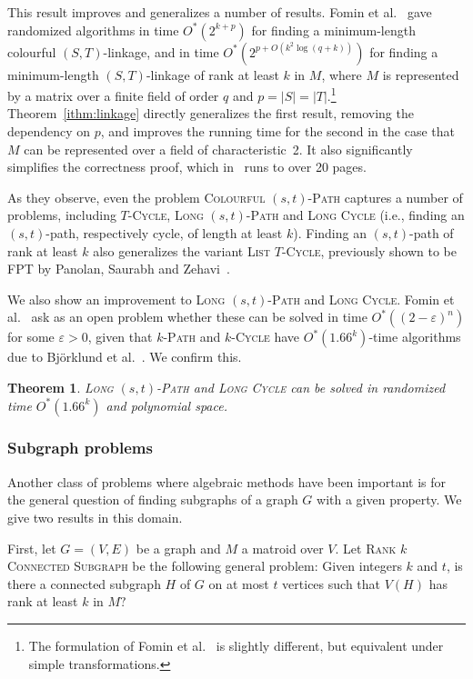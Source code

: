 \documentclass[10pt,a4paper]{article}
\newtheorem{theorem}{Theorem}[section]
\begin{document}
This result improves and generalizes a number of results.
Fomin et al.~\cite{FominGKSS24} gave randomized algorithms in time $O^*(2^{k+p})$
for finding a minimum-length colourful $(S,T)$-linkage,
and in time $O^*(2^{p+O(k^2 \log (q+k))})$
for finding a minimum-length $(S,T)$-linkage of rank at least $k$ in $M$,
where $M$ is represented by a matrix over a finite field of order $q$
and $p=|S|=|T|$.\footnote{The formulation of Fomin et al.~\cite{FominGKSS24}
  is slightly different, but equivalent under simple transformations.}
Theorem~\ref{ithm:linkage} directly generalizes the first result,
removing the dependency on $p$, and improves the running time for the second in the case
that $M$ can be represented over a field of characteristic~2.
It also significantly simplifies the correctness proof, which in~\cite{FominGKSS24}
runs to over 20 pages.

As they observe, even the problem \textsc{Colourful $(s,t)$-Path}
captures a number of problems, including \textsc{$T$-Cycle},
\textsc{Long $(s,t)$-Path} and \textsc{Long Cycle} (i.e.,
finding an $(s,t)$-path, respectively cycle, of length at least $k$).
Finding an $(s,t)$-path of rank at least $k$ also generalizes the
variant \textsc{List $T$-Cycle}, previously shown to be FPT by
Panolan, Saurabh and Zehavi~\cite{DBLP:journals/algorithmica/PanolanSZ19}.

We also show an improvement to \textsc{Long $(s,t)$-Path} and
\textsc{Long Cycle}. Fomin et al.~\cite{FominGKSS24} ask as an
open problem whether these can be solved in time $O^*((2-\varepsilon)^n)$
for some $\varepsilon > 0$, given that \textsc{$k$-Path} and \textsc{$k$-Cycle} 
have $O^*(1.66^k)$-time algorithms due to Björklund et al.~\cite{BjorklundHKK17narrow}. 
We confirm this.

\begin{theorem} \label{ithm:longpath}
  \textsc{Long $(s,t)$-Path} and \textsc{Long Cycle} can be solved in
  randomized time $O^*(1.66^k)$ and polynomial space. 
\end{theorem}

\subsubsection{Subgraph problems}
\label{ssec:subgraph}
Another class of problems where algebraic methods have been important
is for the general question of finding subgraphs of a graph $G$ with a given property. 
We give two results in this domain.

First, let $G=(V,E)$ be a graph and $M$ a matroid over $V$.
Let \textsc{Rank $k$ Connected Subgraph} be the following general problem:
Given integers $k$ and $t$, is there a connected subgraph $H$ of $G$
on at most $t$ vertices such that $V(H)$ has rank at least $k$ in $M?$
\end{document}
